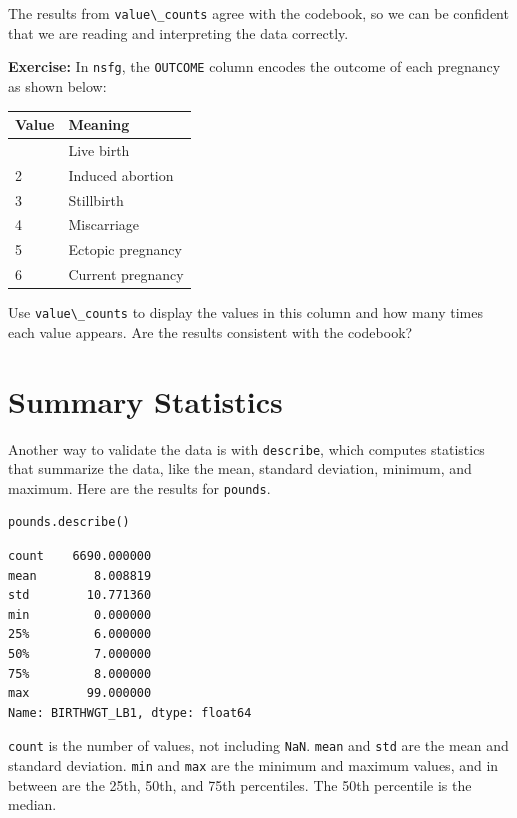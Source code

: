 \documentclass[
]{book}
\newcommand{\passthrough}[1]{#1}
\begin{document}
The results from \passthrough{\lstinline!value\_counts!} agree with the
codebook, so we can be confident that we are reading and interpreting
the data correctly.

\textbf{Exercise:} In \passthrough{\lstinline!nsfg!}, the
\passthrough{\lstinline!OUTCOME!} column encodes the outcome of each
pregnancy as shown below:

\begin{longtable}[]{@{}ll@{}}
\toprule\noalign{}
Value & Meaning \\
\midrule\noalign{}
\endhead
\bottomrule\noalign{}
\endlastfoot
1 & Live birth \\
2 & Induced abortion \\
3 & Stillbirth \\
4 & Miscarriage \\
5 & Ectopic pregnancy \\
6 & Current pregnancy \\
\end{longtable}

Use \passthrough{\lstinline!value\_counts!} to display the values in
this column and how many times each value appears. Are the results
consistent with the codebook?

\section{Summary Statistics}\label{summary-statistics}

Another way to validate the data is with
\passthrough{\lstinline!describe!}, which computes statistics that
summarize the data, like the mean, standard deviation, minimum, and
maximum. Here are the results for \passthrough{\lstinline!pounds!}.

\begin{lstlisting}[language=Python]
pounds.describe()
\end{lstlisting}

\begin{lstlisting}
count    6690.000000
mean        8.008819
std        10.771360
min         0.000000
25%         6.000000
50%         7.000000
75%         8.000000
max        99.000000
Name: BIRTHWGT_LB1, dtype: float64
\end{lstlisting}

\passthrough{\lstinline!count!} is the number of values, not including
\passthrough{\lstinline!NaN!}. \passthrough{\lstinline!mean!} and
\passthrough{\lstinline!std!} are the mean and standard deviation.
\passthrough{\lstinline!min!} and \passthrough{\lstinline!max!} are the
minimum and maximum values, and in between are the 25th, 50th, and 75th
percentiles. The 50th percentile is the median.
\end{document}
